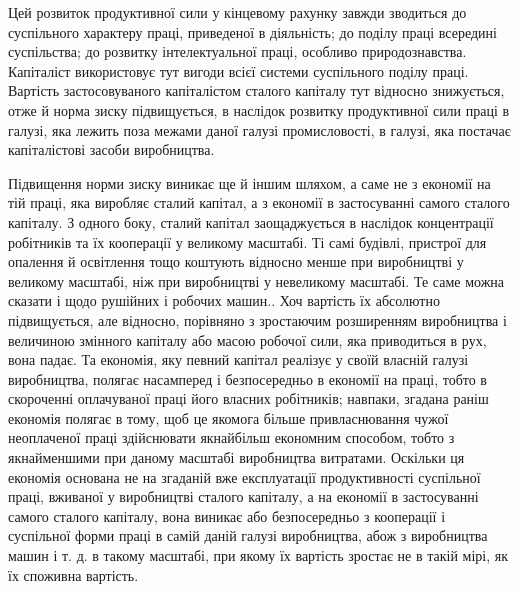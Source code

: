 \parcont{}  %
Цей розвиток продуктивної сили у кінцевому рахунку завжди
зводиться до суспільного характеру праці, приведеної в діяльність;
до поділу праці всередині суспільства; до розвитку інтелектуальної
праці, особливо природознавства. Капіталіст використовує
тут вигоди всієї системи суспільного поділу праці.
Вартість застосовуваного капіталістом сталого капіталу тут
відносно знижується, отже й норма зиску підвищується, в наслідок
розвитку продуктивної сили праці в галузі, яка лежить
поза межами даної галузі промисловості, в галузі, яка постачає
капіталістові засоби виробництва.

Підвищення норми зиску виникає ще й іншим шляхом, а саме
не з економії на тій праці, яка виробляє сталий капітал, а з економії
в застосуванні самого сталого капіталу. З одного боку,
сталий капітал заощаджується в наслідок концентрації робітників
та їх кооперації у великому масштабі. Ті самі будівлі, пристрої
для опалення й освітлення тощо коштують відносно
менше при виробництві у великому масштабі, ніж при виробництві
у невеликому масштабі. Те саме можна сказати і щодо
рушійних і робочих машин.. Хоч вартість їх абсолютно підвищується,
але відносно, порівняно з зростаючим розширенням
виробництва і величиною змінного капіталу або масою робочої
сили, яка приводиться в рух, вона падає. Та економія, яку певний
капітал реалізує у своїй власній галузі виробництва, полягає
насамперед і безпосередньо в економії на праці, тобто в скороченні
оплачуваної праці його власних робітників; навпаки, згадана
раніш економія полягає в тому, щоб це якомога більше привласнювання
чужої неоплаченої праці здійснювати якнайбільш економним
способом, тобто з якнайменшими при даному масштабі
виробництва витратами. Оскільки ця економія основана не
на згаданій вже експлуатації продуктивності суспільної праці,
вживаної у виробництві сталого капіталу, а на економії в застосуванні
самого сталого капіталу, вона виникає або безпосередньо
з кооперації і суспільної форми праці в самій даній галузі виробництва,
абож з виробництва машин і т. д. в такому масштабі,
при якому їх вартість зростає не в такій мірі, як їх споживна
вартість.

